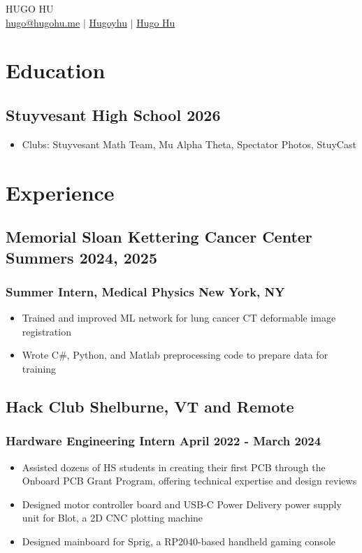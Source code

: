 \documentclass[11pt]{article}
\begin{document}
\begin{center}
    {\fontsize{36}{36}\selectfont\interthin HUGO \interheavy HU} \\ \bigskip
    {\color{icnclr}\faEnvelope[regular]} \href{mailto:hugo@hugohu.me}{hugo@hugohu.me} $|$ 
    {\color{icnclr}\faGithub} \href{https://github.com/Hugoyhu}{Hugoyhu} $|$
    {\color{icnclr}\faLinkedinIn} \href{https://www.linkedin.com/in/hugo-hu-a4a67821a/}{Hugo Hu}
\end{center}

\section{Education}
\subsection{Stuyvesant High School \hfill 2026}
\begin{itemize}
    \item Clubs: Stuyvesant Math Team, Mu Alpha Theta, Spectator Photos, StuyCast
\end{itemize}


\section{Experience}
\subsection{Memorial Sloan Kettering Cancer Center \hfill Summers 2024, 2025}
\subsubsection{Summer Intern, Medical Physics \hfill New York, NY}
\begin{itemize}
    \item Trained and improved ML network for lung cancer CT deformable image registration
    \item Wrote C\#, Python, and Matlab preprocessing code to prepare data for training 
\end{itemize}

\subsection{Hack Club \hfill Shelburne, VT and Remote}
\subsubsection{Hardware Engineering Intern \hfill April 2022 - March 2024}
\begin{itemize}
    \item Assisted dozens of HS students in creating their first PCB through the Onboard PCB Grant Program, offering technical expertise and design reviews
    \item Designed motor controller board and USB-C Power Delivery power supply unit for Blot, a 2D CNC plotting machine
    \item Designed mainboard for Sprig, a RP2040-based handheld gaming console
\end{itemize}
\end{document}
